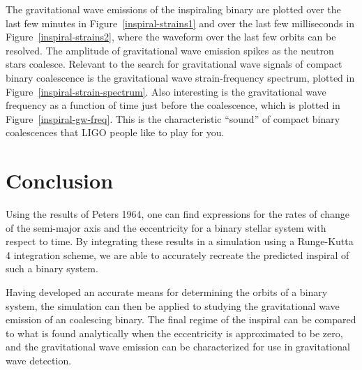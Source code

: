 \documentclass[preprint2]{aastex}
\begin{document}
The gravitational wave emissions of the inspiraling binary are plotted over the last few minutes in Figure~\ref{inspiral-strains1} and over the last few milliseconds in Figure~\ref{inspiral-strains2}, where the waveform over the last few orbits can be resolved. The amplitude of gravitational wave emission spikes as the neutron stars coalesce. Relevant to the search for gravitational wave signals of compact binary coalescence is the gravitational wave strain-frequency spectrum, plotted in Figure~\ref{inspiral-strain-spectrum}. Also interesting is the gravitational wave frequency as a function of time just before the coalescence, which is plotted in Figure~\ref{inspiral-gw-freq}. This is the characteristic ``sound'' of compact binary coalescences that LIGO people like to play for you.

\section{Conclusion}

Using the results of Peters 1964, one can find expressions for the rates of change of the semi-major axis and the eccentricity for a binary stellar system with respect to time. By integrating these results in a simulation using a Runge-Kutta 4 integration scheme, we are able to accurately recreate the predicted inspiral of such a binary system.

Having developed an accurate means for determining the orbits of a binary system, the simulation can then be applied to studying the gravitational wave emission of an coalescing binary. The final regime of the inspiral can be compared to what is found analytically when the eccentricity is approximated to be zero, and the gravitational wave emission can be characterized for use in gravitational wave detection.

\end{document}
